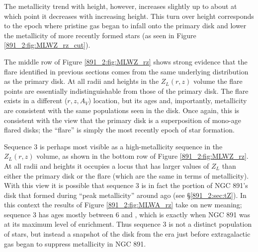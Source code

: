 The metallicity trend with height, however, increases slightly up to
about  at which point it decreases with increasing
height. This turn over height corresponds to the epoch where pristine
gas began to infall onto the primary disk and lower the metallicity of
more recently formed stars (as seen in Figure
\ref{891_2:fig:MLWZ_rz_cut}).

The middle row of Figure \ref{891_2:fig:MLWZ_rz} shows strong evidence
that the flare identified in previous sections comes from the same
underlying distribution as the primary disk. At all radii and heights
in the $Z_L(r,z)$ volume the flare points are essentially
indistinguishable from those of the primary disk. The flare exists in
a different ($r,z,A_V$) location, but its ages and, importantly,
metallicity are consistent with the same populations seen in the
disk. Once again, this is consistent with the view that the primary
disk is a superposition of mono-age flared disks; the ``flare'' is
simply the most recently epoch of star formation.


Sequence 3 is perhaps most visible as a high-metallicity sequence in
the $Z_L(r,z)$ volume, as shown in the bottom row of Figure
\ref{891_2:fig:MLWZ_rz}. At all radii and heights it occupies a locus
that has larger values of $Z_L$ than either the primary disk or the
flare (which are the same in terms of metallicity). With this view it
is possible that sequence 3 is in fact the portion of NGC 891's disk
that formed during ``peak metallicity'' around  ago (see
\S\ref{891_2:sec:tZ}). In this context the results of Figure
\ref{891_2:fig:MLWA_rz} take on new meaning; sequence 3 has ages
mostly between 6 and , which is exactly when NGC 891 was
at its maximum level of enrichment. Thus sequence 3 is not a distinct
population of stars, but instead a snapshot of the disk from the era
just before extragalactic gas began to suppress metallicity in NGC 891.



